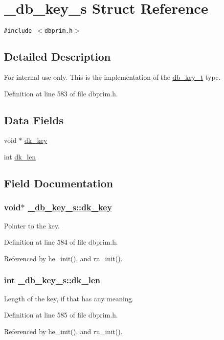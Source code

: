 \hypertarget{struct__db__key__s}{
\section{\_\-db\_\-key\_\-s Struct Reference}
\label{struct__db__key__s}
}
{\tt \#include $<$dbprim.h$>$}



\subsection{Detailed Description}
\begin{Desc}
\item[For internal use only.]
This is the implementation of the \hyperlink{group__dbprim_ga0}{db\_\-key\_\-t} type.\end{Desc}




Definition at line 583 of file dbprim.h.\subsection*{Data Fields}
\begin{CompactItemize}
\item 
void $\ast$ \hyperlink{struct__db__key__s_o0}{dk\_\-key}
\item 
int \hyperlink{struct__db__key__s_o1}{dk\_\-len}
\end{CompactItemize}


\subsection{Field Documentation}
\hypertarget{struct__db__key__s_o0}{
\subsubsection[dk\_\-key]{\setlength{\rightskip}{0pt plus 5cm}void$\ast$ \hyperlink{struct__db__key__s_o0}{\_\-db\_\-key\_\-s::dk\_\-key}}}
\label{struct__db__key__s_o0}


Pointer to the key. 

Definition at line 584 of file dbprim.h.

Referenced by he\_\-init(), and rn\_\-init().\hypertarget{struct__db__key__s_o1}{
\subsubsection[dk\_\-len]{\setlength{\rightskip}{0pt plus 5cm}int \hyperlink{struct__db__key__s_o1}{\_\-db\_\-key\_\-s::dk\_\-len}}}
\label{struct__db__key__s_o1}


Length of the key, if that has any meaning. 

Definition at line 585 of file dbprim.h.

Referenced by he\_\-init(), and rn\_\-init().